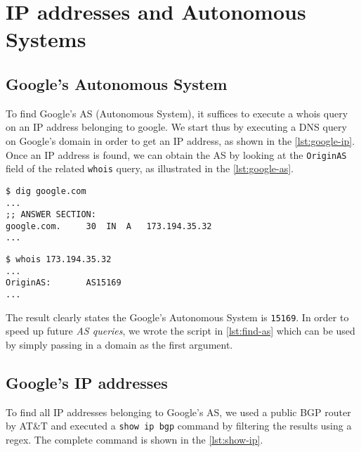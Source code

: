 \documentclass[10pt,a4paper,twoside,onecolumn]{article}
\begin{document}


\cleardoublepage

\setcounter{page}{1}

\section{IP addresses and Autonomous Systems}

\subsection{Google's Autonomous System}

To find Google's AS (Autonomous System), it suffices to execute a whois query on an IP address belonging to google. We start thus by executing a DNS query on Google's domain in order to get an IP address, as shown in the \autoref{lst:google-ip}. Once an IP address is found, we can obtain the AS by looking at the \texttt{OriginAS} field of the related \texttt{whois} query, as illustrated in the \autoref{lst:google-as}.

\lstset{caption=,label=lst:google-ip,language=bash,numbers=none}
\begin{lstlisting}
$ dig google.com
...
;; ANSWER SECTION:
google.com.		30	IN	A	173.194.35.32
...
\end{lstlisting}

\lstset{caption=,label=lst:google-as,language=bash,numbers=none}
\begin{lstlisting}
$ whois 173.194.35.32
...
OriginAS:       AS15169
...
\end{lstlisting}

The result clearly states the Google's Autonomous System is \texttt{15169}. In order to speed up future \emph{AS queries}, we wrote the script in \autoref{lst:find-as} which can be used by simply passing in a domain as the first argument.




\subsection{Google's IP addresses}

To find all IP addresses belonging to Google's AS, we used a public BGP router by AT\&T and executed a \texttt{show ip bgp} command by filtering the results using a regex. The complete command is shown in the \autoref{lst:show-ip}.
\end{document}
